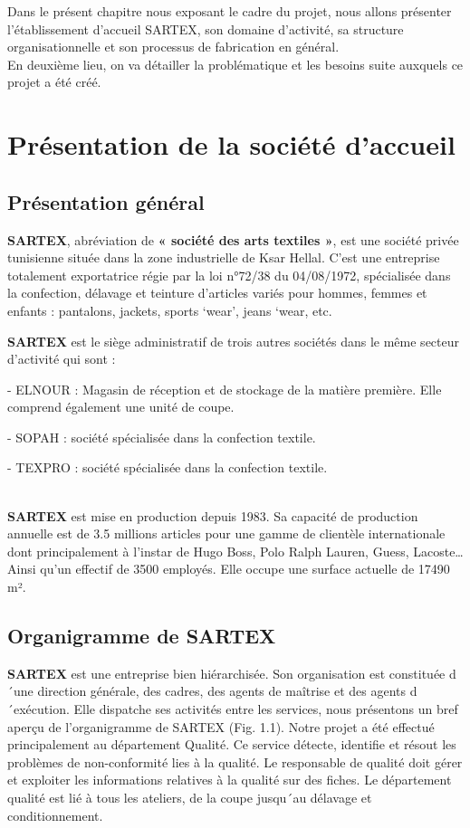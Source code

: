 \documentclass[12pt, a4paper]{thesis}
\begin{document}
Dans le présent chapitre nous exposant le cadre du projet, nous allons présenter l’établissement d’accueil SARTEX, son domaine d’activité, sa structure organisationnelle et son processus de fabrication en général.\\
En deuxième lieu, on va détailler la problématique et les besoins suite auxquels ce projet a été créé.



\vspace{-0.5cm}
\section{Présentation de la société d'accueil}
\subsection{Présentation général}

\textbf{SARTEX}, abréviation de \textbf{« société des arts textiles »}, est une société privée tunisienne située dans la zone industrielle de Ksar Hellal. C’est une entreprise totalement exportatrice régie par la loi n°72/38 du 04/08/1972, spécialisée dans la confection, délavage et teinture d’articles variés pour hommes, femmes et enfants : pantalons, jackets, sports ‘wear’, jeans ‘wear, etc. 

\textbf{SARTEX} est le siège administratif de trois autres sociétés dans le même secteur d’activité qui sont :
\item - ELNOUR : Magasin de réception et de stockage de la matière première. Elle comprend également une unité de coupe.
\item - SOPAH : société spécialisée dans la confection textile.
\item - TEXPRO : société spécialisée dans la confection textile.

\\ \textbf{SARTEX} est mise en production depuis 1983. Sa capacité de production annuelle est de 3.5 millions articles pour une gamme de clientèle internationale dont principalement à l’instar de Hugo Boss, Polo Ralph Lauren, Guess, Lacoste… Ainsi qu’un effectif de 3500 employés. Elle occupe une surface actuelle de 17490 m².

\subsection{Organigramme de SARTEX}

\textbf{SARTEX} est une entreprise bien hiérarchisée. Son organisation est constituée d´une direction générale, des cadres, des agents de maîtrise et des agents d´exécution.
Elle dispatche ses activités entre les services, nous présentons un bref aperçu de l'organigramme de SARTEX (Fig. 1.1).
Notre projet a été effectué principalement au département Qualité. Ce service détecte, identifie et résout les problèmes de non-conformité lies à la qualité. Le responsable de qualité doit gérer et exploiter les informations relatives à la qualité sur des fiches. Le département qualité est lié à tous les ateliers, de la coupe jusqu´au délavage et conditionnement.
\end{document}
